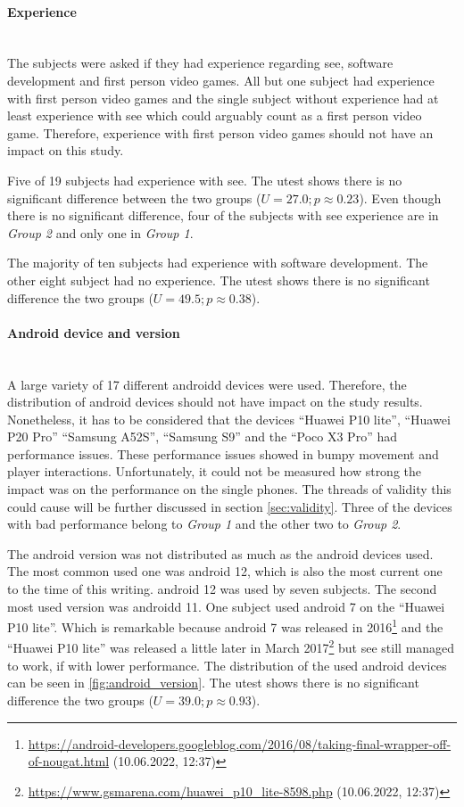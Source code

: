 \paragraph{Experience}\mbox{}\\
The subjects were asked if they had experience regarding \gls{see}, software development and first person video games.
All but one subject had experience with first person video games and the single subject without experience had at least experience with \gls{see} which could arguably count as a first person video game.
Therefore, experience with first person video games should not have an impact on this study.

Five of 19 subjects had experience with \gls{see}.
The \gls{utest} shows there is no significant difference between the two groups ($U = 27.0; p \approx 0.23$).
Even though there is no significant difference, four of the subjects with \gls{see} experience are in \textit{Group 2} and only one in \textit{Group 1}.

The majority of ten subjects had experience with software development.
The other eight subject had no experience.
The \gls{utest} shows there is no significant difference the two groups ($U = 49.5; p \approx 0.38$).

\paragraph{Android device and version}\mbox{}\\
A large variety of 17 different \gls{android}d devices were used.
Therefore, the distribution of \gls{android} devices should not have impact on the study results.
Nonetheless, it has to be considered that the devices \enquote{Huawei P10 lite}, \enquote{Huawei P20 Pro} \enquote{Samsung A52S}, \enquote{Samsung S9} and the \enquote{Poco X3 Pro} had performance issues.
These performance issues showed in bumpy movement and player interactions.
Unfortunately, it could not be measured how strong the impact was on the performance on the single phones.
The threads of validity this could cause will be further discussed in section \ref{sec:validity}.
Three of the devices with bad performance belong to \textit{Group 1} and the other two to \textit{Group 2}.

The \gls{android} version was not distributed as much as the \gls{android} devices used. 
The most common used one was \gls{android} 12, which is also the most current one to the time of this writing.
\gls{android} 12 was used by seven subjects.
The second most used version was \gls{android}d 11.
One subject used \gls{android} 7 on the \enquote{Huawei P10 lite}.
Which is remarkable because \gls{android} 7 was released in 2016\footnote{\url{https://android-developers.googleblog.com/2016/08/taking-final-wrapper-off-of-nougat.html} (10.06.2022, 12:37)} and the \enquote{Huawei P10 lite} was released a little later in March 2017\footnote{\url{https://www.gsmarena.com/huawei_p10_lite-8598.php} (10.06.2022, 12:37)} but \gls{see} still managed to work, if with lower performance.
The distribution of the used \gls{android} devices can be seen in \ref{fig:android_version}.
The \gls{utest} shows there is no significant difference the two groups ($U = 39.0; p \approx 0.93$).


